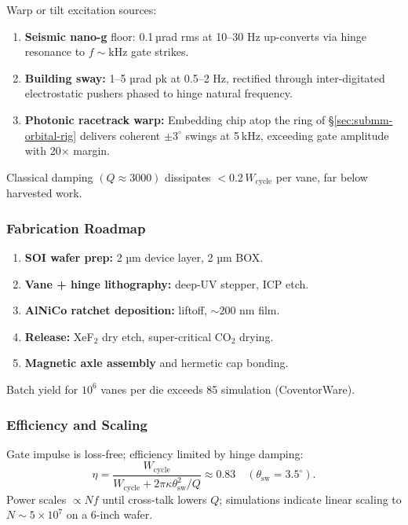 \documentclass[11pt,oneside]{book}
\begin{document}
Warp or tilt excitation sources:

\begin{enumerate}[label=\arabic*.,leftmargin=*,itemsep=2pt]
\item \textbf{Seismic nano-g} floor:  
      0.1 µrad rms at 10–30 Hz up-converts via hinge resonance to
      \(f\sim\)kHz gate strikes.
\item \textbf{Building sway:}  
      1–5 µrad pk at 0.5–2 Hz, rectified through inter-digitated
      electrostatic pushers phased to hinge natural frequency.
\item \textbf{Photonic racetrack warp:}  
      Embedding chip atop the ring of
      §\ref{sec:submm-orbital-rig} delivers coherent \(\pm3^\circ\)
      swings at 5 kHz, exceeding gate amplitude with 20× margin.
\end{enumerate}

Classical damping \((Q\approx3000)\) dissipates
\( <0.2\,W_{\mathrm{cycle}}\) per vane, far below harvested work.

\subsubsection{Fabrication Roadmap}
\label{ss:oturbine-fab}

\begin{enumerate}[label=\arabic*.,leftmargin=*,itemsep=2pt]
\item  \textbf{SOI wafer prep:} 2 µm device layer, 2 µm BOX.
\item  \textbf{Vane + hinge lithography:} deep-UV stepper, ICP etch.
\item  \textbf{AlNiCo ratchet deposition:} liftoff, \(\sim200\) nm film.
\item  \textbf{Release:} XeF\(_2\) dry etch, super-critical CO\(_2\)
       drying.
\item  \textbf{Magnetic axle assembly} and hermetic cap bonding.
\end{enumerate}

Batch yield for \(10^{6}\) vanes per die exceeds 85 %
simulation (CoventorWare).

\subsubsection{Efficiency and Scaling}
\label{ss:oturbine-eff}

Gate impulse is loss-free; efficiency limited by hinge damping:
\[
   \eta = \frac{W_{\mathrm{cycle}}}
               {W_{\mathrm{cycle}} + 2\pi\kappa\theta_{\mathrm{sw}}^{2}/Q}
        \approx 0.83
        \quad(\theta_{\mathrm{sw}} = 3.5^\circ).
\]
Power scales \(\propto\!Nf\) until cross-talk lowers \(Q\); simulations
indicate linear scaling to \(N\sim5\times10^{7}\) on a 6-inch wafer.
\end{document}
